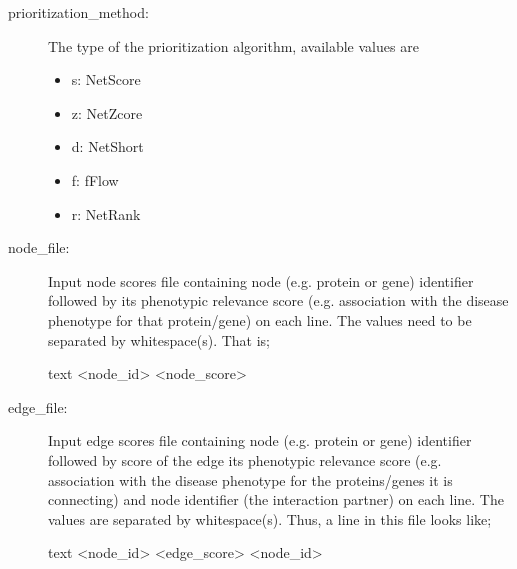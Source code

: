 \documentclass[11pt,twoside]{article}
\newcommand{\printcommand}[1]{\colorbox{code}{\scriptsize{\BUseVerbatim{#1}}}}
\begin{document}
\begin{description}
    \item[prioritization\_method:] The type of the prioritization algorithm, 
	available values are 
	\begin{itemize}
	    \item s: NetScore
	    \item z: NetZcore 
	    \item d: NetShort 
	    \item f: fFlow 
	    \item r: NetRank
	\end{itemize}

    \item[node\_file:] Input node scores file containing node (e.g. protein or 
	gene) identifier followed by its phenotypic relevance score (e.g. 
	association with the disease phenotype for that protein/gene) on each 
	line. The values need to be separated by whitespace(s). That is;
\begin{SaveVerbatim}{text}
<node_id> <node_score>
\end{SaveVerbatim}
\printcommand{text}

    \item[edge\_file:] Input edge scores file containing node (e.g. protein or 
	gene) identifier followed by score of the edge its phenotypic 
	relevance score (e.g. association with the disease phenotype for the 
	proteins/genes it is connecting) and node identifier (the interaction 
	partner) on each line. The values are separated by whitespace(s). Thus, 
	a line in this file looks like;
\begin{SaveVerbatim}{text}
<node_id> <edge_score> <node_id>
\end{SaveVerbatim}
\printcommand{text}


\end{description}
\end{document}
